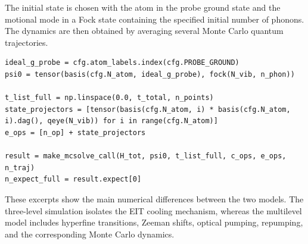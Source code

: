 \documentclass[../../thesis_main.tex]{subfiles}
\begin{document}
The initial state is chosen with the atom in the probe ground state and
the motional mode in a Fock state containing the specified initial
number of phonons. The dynamics are then obtained by averaging several
Monte Carlo quantum trajectories.

\begin{lstlisting}[caption={Initial state and Monte Carlo evolution.},
label={lst:multilevel_montecarlo}]
ideal_g_probe = cfg.atom_labels.index(cfg.PROBE_GROUND)
psi0 = tensor(basis(cfg.N_atom, ideal_g_probe), fock(N_vib, n_phon))

t_list_full = np.linspace(0.0, t_total, n_points)
state_projectors = [tensor(basis(cfg.N_atom, i) * basis(cfg.N_atom, i).dag(), qeye(N_vib)) for i in range(cfg.N_atom)]
e_ops = [n_op] + state_projectors

result = make_mcsolve_call(H_tot, psi0, t_list_full, c_ops, e_ops, n_traj)
n_expect_full = result.expect[0]
\end{lstlisting}

These excerpts show the main numerical differences between the two
models. The three-level simulation isolates the EIT cooling mechanism,
whereas the multilevel model includes hyperfine transitions, Zeeman
shifts, optical pumping, repumping, and the corresponding Monte Carlo
dynamics.
\end{document}

